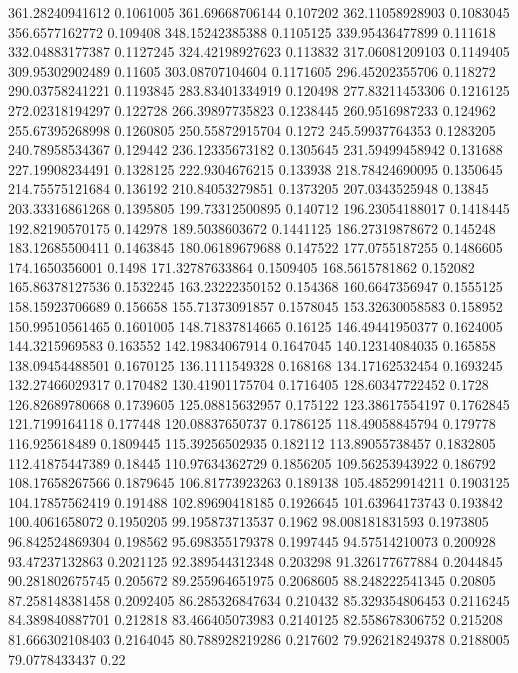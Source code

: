 361.28240941612 0.1061005
361.69668706144 0.107202
362.11058928903 0.1083045
356.6577162772 0.109408
348.15242385388 0.1105125
339.95436477899 0.111618
332.04883177387 0.1127245
324.42198927623 0.113832
317.06081209103 0.1149405
309.95302902489 0.11605
303.08707104604 0.1171605
296.45202355706 0.118272
290.03758241221 0.1193845
283.83401334919 0.120498
277.83211453306 0.1216125
272.02318194297 0.122728
266.39897735823 0.1238445
260.9516987233 0.124962
255.67395268998 0.1260805
250.55872915704 0.1272
245.59937764353 0.1283205
240.78958534367 0.129442
236.12335673182 0.1305645
231.59499458942 0.131688
227.19908234491 0.1328125
222.9304676215 0.133938
218.78424690095 0.1350645
214.75575121684 0.136192
210.84053279851 0.1373205
207.0343525948 0.13845
203.33316861268 0.1395805
199.73312500895 0.140712
196.23054188017 0.1418445
192.82190570175 0.142978
189.5038603672 0.1441125
186.27319878672 0.145248
183.12685500411 0.1463845
180.06189679688 0.147522
177.0755187255 0.1486605
174.1650356001 0.1498
171.32787633864 0.1509405
168.5615781862 0.152082
165.86378127536 0.1532245
163.23222350152 0.154368
160.6647356947 0.1555125
158.15923706689 0.156658
155.71373091857 0.1578045
153.32630058583 0.158952
150.99510561465 0.1601005
148.71837814665 0.16125
146.49441950377 0.1624005
144.3215969583 0.163552
142.19834067914 0.1647045
140.12314084035 0.165858
138.09454488501 0.1670125
136.1111549328 0.168168
134.17162532454 0.1693245
132.27466029317 0.170482
130.41901175704 0.1716405
128.60347722452 0.1728
126.82689780668 0.1739605
125.08815632957 0.175122
123.38617554197 0.1762845
121.7199164118 0.177448
120.08837650737 0.1786125
118.49058845794 0.179778
116.925618489 0.1809445
115.39256502935 0.182112
113.89055738457 0.1832805
112.41875447389 0.18445
110.97634362729 0.1856205
109.56253943922 0.186792
108.17658267566 0.1879645
106.81773923263 0.189138
105.48529914211 0.1903125
104.17857562419 0.191488
102.89690418185 0.1926645
101.63964173743 0.193842
100.4061658072 0.1950205
99.195873713537 0.1962
98.008181831593 0.1973805
96.842524869304 0.198562
95.698355179378 0.1997445
94.57514210073 0.200928
93.47237132863 0.2021125
92.389544312348 0.203298
91.326177677884 0.2044845
90.281802675745 0.205672
89.255964651975 0.2068605
88.248222541345 0.20805
87.258148381458 0.2092405
86.285326847634 0.210432
85.329354806453 0.2116245
84.389840887701 0.212818
83.466405073983 0.2140125
82.558678306752 0.215208
81.666302108403 0.2164045
80.788928219286 0.217602
79.926218249378 0.2188005
79.0778433437 0.22

